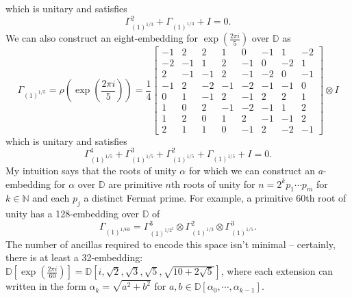 \documentclass{article}
\theoremstyle{definition}
\theoremstyle{theorem}
\theoremstyle{remark}
\begin{document}
	which is unitary and satisfies
	\[
		\Gamma_{(1)^{1/3}}^2 + \Gamma_{(1)^{1/3}} + I =0.
	\]
	We can also construct an eight-embedding for $\exp\left(\frac{2\pi i}{5}\right)$ over $\mathbb{D}$ as
	\[
	\Gamma_{(1)^{1/5}} = \rho\left(\exp\left(\frac{2\pi i}{5}\right)\right) = \frac{1}{4}\begin{bmatrix}
	-1 & 2 & 2 & 1 & 0 & -1 & 1 & -2 \\
	-2 & -1 & 1 & 2 & -1 & 0 & -2 & 1\\
	2 & -1 & -1 & 2 & -1 & -2 & 0 & -1\\
	-1 & 2 & -2 & -1 & -2 & -1 & -1 & 0\\
	0 & 1 & -1 & 2 & -1 & 2 & 2 & 1 \\
	1 & 0 & 2 & -1 & -2 & -1 & 1 & 2\\
	1 & 2 & 0 & 1 & 2 & -1 & -1 & 2\\
	2 & 1 & 1 & 0 & -1 & 2 & -2 & -1
	\end{bmatrix}\otimes I
	\]
	which is unitary and satisfies
	\[
	\Gamma_{(1)^{1/5}} ^4 + \Gamma_{(1)^{1/5}} ^3 +\Gamma_{(1)^{1/5}} ^2 + \Gamma_{(1)^{1/5}}  + I =0.
	\]
	My intuition says that the roots of unity $\alpha$ for which we can construct an $a$-embedding for $\alpha$ over $\mathbb{D}$ are primitive $n$th roots of unity for $n=2^k p_1 \cdots p_m$ for $k\in\mathbb{N}$ and each $p_j$ a distinct Fermat prime. For example, a primitive 60th root of unity has a 128-embedding over $\mathbb{D}$ of
	\[
		\Gamma_{(1)^{1/60}} = \Gamma_{(1)^{1/2^2}}^3 \otimes \Gamma_{(1)^{1/3}}^2\otimes\Gamma_{(1)^{1/5}}^3.
	\]
	The number of ancillas required to encode this space isn't minimal -- certainly, there is at least a 32-embedding: $\mathbb{D}\left[\exp\left(\frac{2\pi i}{60}\right)\right] = \mathbb{D}\left[i,\sqrt{2},\sqrt{3},\sqrt{5},\sqrt{10+2\sqrt{5}}\right]$, where each extension can written in the form $\alpha_k = \sqrt{a^2+b^2}$ for $a,b\in \mathbb{D}[\alpha_0,\cdots,\alpha_{k-1}]$.
	
\end{document}
